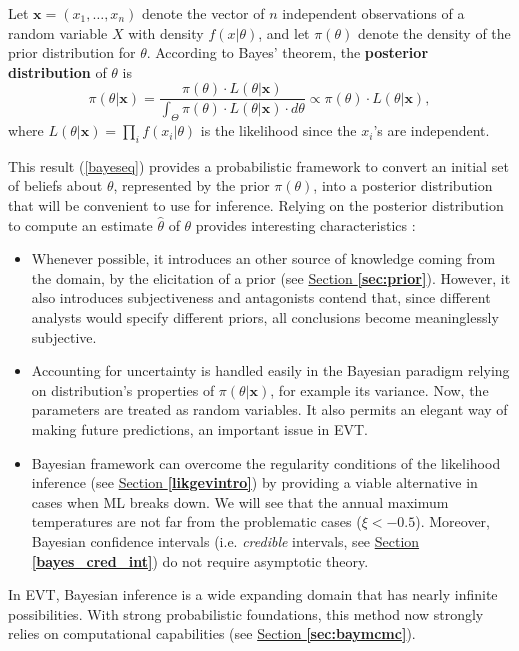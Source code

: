 \begin{definition}
	Let $\boldsymbol{x}=(x_1,\dots,x_n)$
	denote the vector of $n$ independent observations of a random variable $X$ with density $f(x|\theta)$, and let $\pi(\theta)$ denote the density of the prior distribution for $\theta$. According to Bayes' theorem, the \textbf{posterior distribution} of $\theta$ is 
	\begin{equation}\label{bayeseq}
	\pi (\theta|\boldsymbol{x})=\frac{\pi(\theta)\cdot L(\theta|\boldsymbol{x})}{\int_{\Theta} 
		\pi(\theta)\cdot L(\theta|\boldsymbol{x}) \cdot d\theta}\propto \pi(\theta)\cdot 
	L(\theta|\boldsymbol{x}),
	\end{equation}
	where $L(\theta|\boldsymbol{x})=\prod_i f(x_i|\theta)$ is the likelihood since the $x_i$'s are independent.
\end{definition}
This result (\ref{bayeseq}) provides a probabilistic framework to convert an initial set of beliefs about $\theta$, represented by the prior $\pi(\theta)$, into a posterior distribution that will be convenient to use for inference.
Relying on the posterior distribution to compute an estimate $\hat{\theta}$ of $\theta$ provides interesting characteristics :
\begin{itemize}
	\item Whenever possible, it introduces an other source of knowledge coming from the domain, by the elicitation of a prior (see \hyperref[sec:prior]{Section \textbf{\ref{sec:prior}}}). However, it also introduces subjectiveness and antagonists contend that, since different analysts would specify
	different priors, all conclusions become meaninglessly subjective.
	
	\item\label{it2bayes} Accounting for  uncertainty is handled easily in the
	Bayesian paradigm relying on distribution's properties of $\pi(\theta|\boldsymbol{x})$, for example its variance. Now, the parameters are treated as random variables. %
	 It also permits an elegant way of making future predictions, an important issue in EVT.
	
	\item Bayesian framework can overcome the regularity conditions of the likelihood inference
	(see \hyperref[likgevintro]{Section \textbf{\ref{likgevintro}}}) by providing a viable alternative in cases when ML breaks down. We will see that the annual maximum temperatures  are not far from the problematic cases ($\xi<-0.5$). 
	Moreover, Bayesian confidence intervals (i.e. \emph{credible} intervals, see \hyperref[bayes_cred_int]{Section \textbf{\ref{bayes_cred_int}}}) do not require asymptotic theory.
\end{itemize}
In EVT, Bayesian inference is a wide expanding domain that has nearly infinite possibilities.
With strong probabilistic foundations, this method now strongly relies on computational capabilities (see \hyperref[sec:baymcmc]{Section \textbf{\ref{sec:baymcmc}}}).


